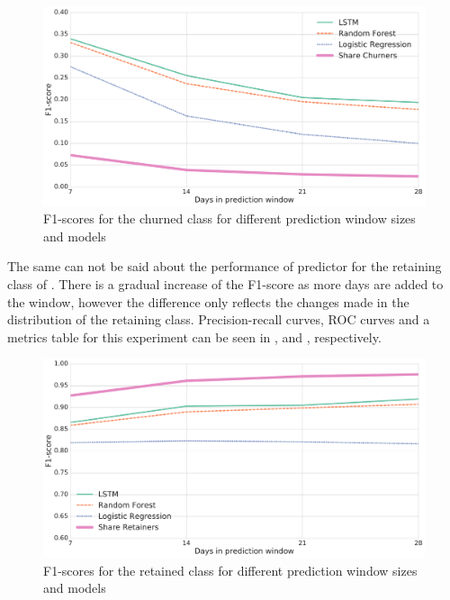 \documentclass{kththesis}
\begin{document}
\begin{figure}[H]
    \centering
    \includegraphics[width=1.0\textwidth,keepaspectratio]{figures/line_pred_window.pdf}
    \caption{F1-scores for the churned class for different prediction window sizes and models}
    \label{fig:line_pred_window}
\end{figure}

The same can not be said about the performance of predictor for the retaining class of . There is a gradual increase of the F1-score as more days are added to the window, however the difference only reflects the changes made in the  distribution of the retaining class. Precision-recall curves, ROC curves and a metrics table for this experiment can be seen in ,  and , respectively.

\begin{figure}[H]
    \centering
    \includegraphics[width=1.0\textwidth,keepaspectratio]{figures/line_pred_window_retained.pdf}
    \caption{F1-scores for the retained class for different prediction window sizes and models}
    \label{fig:line_pred_window_ret}
\end{figure}
\end{document}
